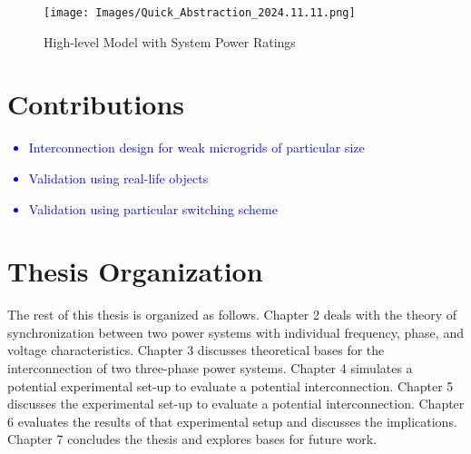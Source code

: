 \begin{figure}
    \centering
    \texttt{[image: Images/Quick\_Abstraction\_2024.11.11.png]}
    \caption{High-level Model with System Power Ratings}
    \label{fig:Quick_Abstraction}
\end{figure}

\section{Contributions}

\textcolor{blue}{
\begin{itemize}
    \item Interconnection design for weak microgrids of particular size
    \item Validation using real-life objects
    \item Validation using particular switching scheme
\end{itemize}
}

\section{Thesis Organization}

The rest of this thesis is organized as follows. Chapter 2 deals with the theory of synchronization between two power systems with individual frequency, phase, and voltage characteristics. Chapter 3 discusses theoretical bases for the interconnection of two three-phase power systems. Chapter 4 simulates a potential experimental set-up to evaluate a potential interconnection. Chapter 5 discusses the experimental set-up to evaluate a potential interconnection. Chapter 6 evaluates the results of that experimental setup and discusses the implications. Chapter 7 concludes the thesis and explores bases for future work.